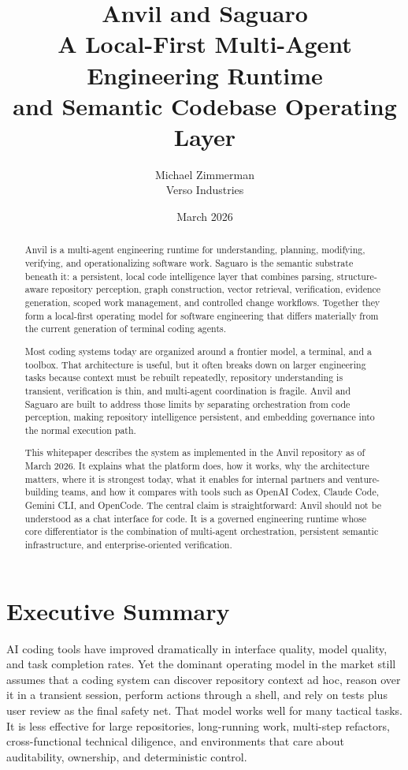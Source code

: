 \documentclass[11pt,a4paper]{article}
\title{\textbf{Anvil and Saguaro}\\A Local-First Multi-Agent Engineering Runtime\\and Semantic Codebase Operating Layer}
\author{Michael Zimmerman\\Verso Industries}
\date{March 2026}
\begin{document}
\maketitle

\begin{abstract}
Anvil is a multi-agent engineering runtime for understanding, planning, modifying, verifying, and operationalizing software work. Saguaro is the semantic substrate beneath it: a persistent, local code intelligence layer that combines parsing, structure-aware repository perception, graph construction, vector retrieval, verification, evidence generation, scoped work management, and controlled change workflows. Together they form a local-first operating model for software engineering that differs materially from the current generation of terminal coding agents.

Most coding systems today are organized around a frontier model, a terminal, and a toolbox. That architecture is useful, but it often breaks down on larger engineering tasks because context must be rebuilt repeatedly, repository understanding is transient, verification is thin, and multi-agent coordination is fragile. Anvil and Saguaro are built to address those limits by separating orchestration from code perception, making repository intelligence persistent, and embedding governance into the normal execution path.

This whitepaper describes the system as implemented in the Anvil repository as of March 2026. It explains what the platform does, how it works, why the architecture matters, where it is strongest today, what it enables for internal partners and venture-building teams, and how it compares with tools such as OpenAI Codex, Claude Code, Gemini CLI, and OpenCode. The central claim is straightforward: Anvil should not be understood as a chat interface for code. It is a governed engineering runtime whose core differentiator is the combination of multi-agent orchestration, persistent semantic infrastructure, and enterprise-oriented verification.
\end{abstract}

\tableofcontents
\newpage

\section{Executive Summary}
AI coding tools have improved dramatically in interface quality, model quality, and task completion rates. Yet the dominant operating model in the market still assumes that a coding system can discover repository context ad hoc, reason over it in a transient session, perform actions through a shell, and rely on tests plus user review as the final safety net. That model works well for many tactical tasks. It is less effective for large repositories, long-running work, multi-step refactors, cross-functional technical diligence, and environments that care about auditability, ownership, and deterministic control.
\end{document}
